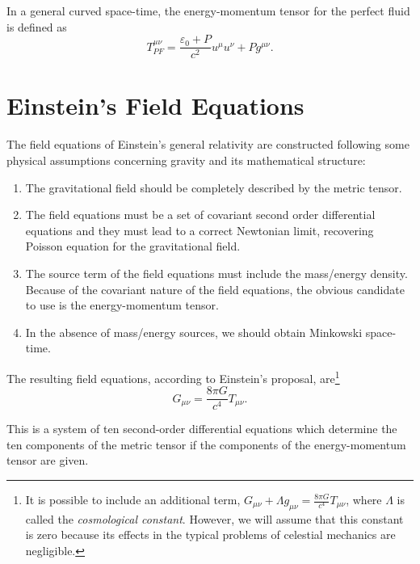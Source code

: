 In a general curved space-time, the energy-momentum tensor for the perfect fluid is defined as 
\begin{equation}
T_{PF}^{\mu\nu}=\frac{\varepsilon_{0}+P}{c^{2}}u^{\mu}u^{\nu}+Pg^{\mu\nu}. 
\end{equation}


\section{Einstein's Field Equations}

The field equations of Einstein's general relativity are constructed following some physical assumptions concerning gravity and its mathematical structure:
\begin{enumerate}
\item The gravitational field should be completely described by the metric tensor.
\item The field equations must be a set of covariant second order differential equations and they must lead to a correct Newtonian limit, recovering Poisson equation for the gravitational field.
\item The source term of the field equations must include the mass/energy density. Because of the covariant nature of the field equations, the obvious candidate to use is the energy-momentum tensor.
\item In the absence of mass/energy sources, we  should obtain Minkowski space-time.
\end{enumerate}

The resulting field equations, according to Einstein's proposal, are\footnote{It is possible to include an additional term, $G_{\mu \nu} + \Lambda g_{\mu \nu}= \frac{8\pi G}{c^4}  T_{\mu \nu}$, where $\Lambda$ is called the \textit{cosmological constant}. However, we will  assume that this constant is zero because its effects in the typical problems of celestial mechanics are negligible.} 
\begin{equation}
G_{\mu \nu} = \frac{8\pi G}{c^4}  T_{\mu \nu}.  \label{eq:EinsteinFieldEquations}
\end{equation}

This is a system of ten second-order differential equations which determine the ten  components of the metric tensor if the components of the energy-momentum tensor are given.

